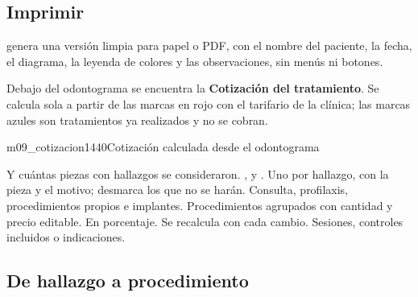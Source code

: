 \documentclass[11pt]{article}
\begin{document}
\subsection{Imprimir}

 genera una versión limpia para papel o PDF, con el nombre del paciente, la fecha, el diagrama, la leyenda de colores y las observaciones, sin menús ni botones.

\label{sec:cotizacion}


Debajo del odontograma se encuentra la \textbf{Cotización del tratamiento}. Se calcula sola a partir de las marcas en rojo con el tarifario de la clínica; las marcas azules son tratamientos ya realizados y no se cobran.

\begin{pantalla}{m09_cotizacion}{1440}{Cotización calculada desde el odontograma}
\end{pantalla}

\begin{leyenda}
   Y cuántas piezas con hallazgos se consideraron.
   ,  y .
   Uno por hallazgo, con la pieza y el motivo; desmarca los que no se harán.
   Consulta, profilaxis, procedimientos propios e implantes.
   Procedimientos agrupados con cantidad y precio editable.
   En porcentaje.
   Se recalcula con cada cambio.
   Sesiones, controles incluidos o indicaciones.
\end{leyenda}

\subsection{De hallazgo a procedimiento}
\end{document}
